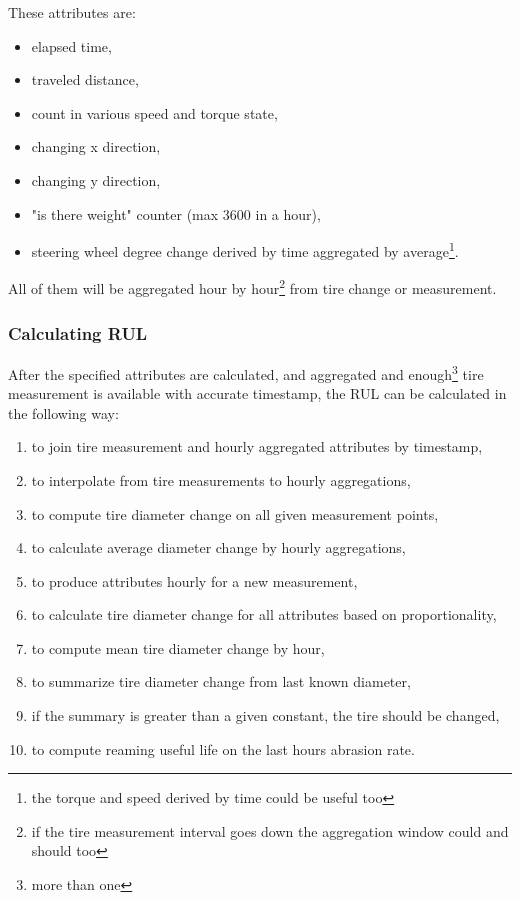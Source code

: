 	These attributes are:
	\begin{itemize}
		\item{elapsed time,} 
		\item{traveled distance,} 
		\item{count in various speed and torque state,}
		\item{changing x direction,}
		\item{changing y direction,}
		\item{"is there weight" counter (max 3600 in a hour),}
		\item{steering wheel degree change derived by time aggregated by average\footnote{the torque and speed derived by time could be useful too}.}
	\end{itemize}
	All of them will be aggregated hour by hour\footnote{if the tire measurement interval goes down the aggregation window could and should too} from tire change or measurement.
	\subsubsection{Calculating RUL}
	After the specified attributes are calculated, and aggregated and enough\footnote{more than one} tire measurement is available with accurate timestamp, the RUL can be calculated in the following way:

	\begin{enumerate}
		\item{to join tire measurement and hourly aggregated attributes by timestamp,}
		\item{to interpolate from tire measurements to hourly aggregations,}
		\item{to compute tire diameter change on all given measurement points,}
		\item{to calculate average diameter change by hourly aggregations,} 
		\item{to produce attributes hourly for a new measurement,}
		\item{to calculate tire diameter change for all attributes based on proportionality,}
		\item{to compute mean tire diameter change by hour,}
		\item{to summarize tire diameter change from last known diameter,}
		\item{if the summary is greater than a given constant, the tire should be changed,}
		\item{to compute reaming useful life on the last hours abrasion rate.}
	\end{enumerate}

